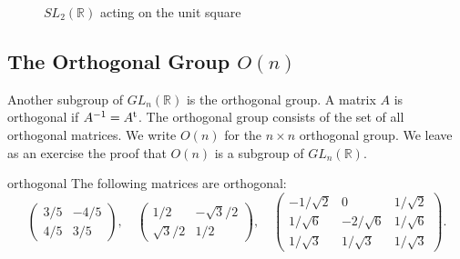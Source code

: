  
\begin{figure}[htb] %

\begin{center}
\end{center}

\caption{$SL_2({\mathbb R})$ acting on the unit square}
\label{SL2}
\end{figure}


 
\subsection*{The Orthogonal Group $O(n)$}
 
 
 
Another subgroup of $GL_n({\mathbb R})$ is the orthogonal group. A matrix
$A$ is {\bfi
orthogonal\/} if
$A^{-1} = A^{\rm t}$. The {\bfi orthogonal
group\/} consists of
the set of all orthogonal matrices. We write
$O(n)$\label{noteorthogonal} for the $n \times n$ orthogonal group. We
leave as an exercise the proof that $O(n)$ is a subgroup of $GL_n(
{\mathbb R})$.
 
 
\begin{example}{orthogonal}
The following matrices are orthogonal:
\[
\begin{pmatrix}
3/5 & -4/5 \\
4/5 & 3/5
\end{pmatrix}, 
\quad
\begin{pmatrix}
1/2 & -\sqrt{3}/2 \\
\sqrt{3}/2 & 1/2
\end{pmatrix}, 
\quad
\begin{pmatrix}
-1/\sqrt{2} & 0 & 1/ \sqrt{2} \\
1/\sqrt{6} & -2/\sqrt{6} & 1/\sqrt{6} \\
1/ \sqrt{3} & 1/ \sqrt{3} & 1/ \sqrt{3} 
\end{pmatrix}.
\]
\end{example}


